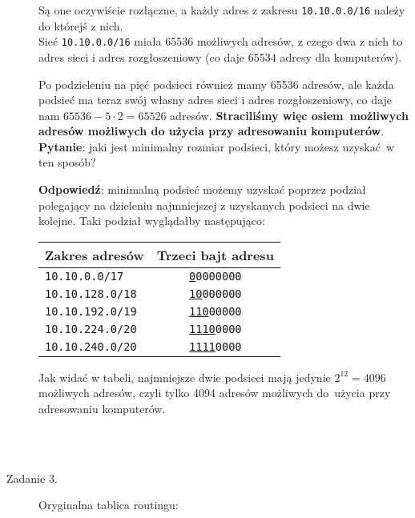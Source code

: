 \documentclass[a4paper, oneside]{article}
\begin{document}
\begin{description}
{        Są one oczywiście rozłączne, a każdy adres z zakresu 
        \texttt{10.10.0.0/16} należy do którejś z nich.\\

        Sieć \texttt{10.10.0.0/16} miała 65536 możliwych adresów, z czego dwa z
        nich to adres sieci i adres rozgłoszeniowy (co daje 65534 adresy dla 
        komputerów).

        Po podzieleniu na pięć podsieci również mamy 65536 adresów, ale każda
        podsieć ma teraz swój własny adres sieci i adres rozgłoszeniowy, co 
        daje nam $65536 - 5 \cdot 2 = 65526$ adresów. \textbf{Straciliśmy więc 
        osiem możliwych adresów możliwych do użycia przy adresowaniu 
        komputerów}.\\

        \textbf{Pytanie}: jaki jest minimalny rozmiar podsieci, który możesz 
        uzyskać w ten sposób?
        
        \textbf{Odpowiedź}: minimalną podsieć możemy uzyskać poprzez podział
        polegający na dzieleniu najmniejszej z uzyskanych podsieci na dwie 
        kolejne. Taki podział wyglądałby następująco:

        \begin{table}[H]
        \centering
        \begin{tabular}{|l|c|}
        \hline
        \textbf{Zakres adresów} & \textbf{Trzeci bajt adresu} \\\hline\hline
        \texttt{10.10.0.0/17}  & \underline{\texttt{0}}\texttt{0000000}\\\hline
        \texttt{10.10.128.0/18}& \underline{\texttt{10}}\texttt{000000}\\\hline
        \texttt{10.10.192.0/19}& \underline{\texttt{110}}\texttt{00000}\\\hline
        \texttt{10.10.224.0/20}& \underline{\texttt{1110}}\texttt{0000}\\\hline
        \texttt{10.10.240.0/20}& \underline{\texttt{1111}}\texttt{0000}\\\hline
        \end{tabular}
        \end{table}

        Jak widać w tabeli, najmniejsze dwie podsieci mają jedynie $2^{12}=4096$
        możliwych adresów, czyli tylko 4094 adresów możliwych do użycia przy 
        adresowaniu komputerów.\\\\
    }
\\
    \item[Zadanie 3.] {
        Oryginalna tablica routingu:

}
\end{description}
\end{document}
